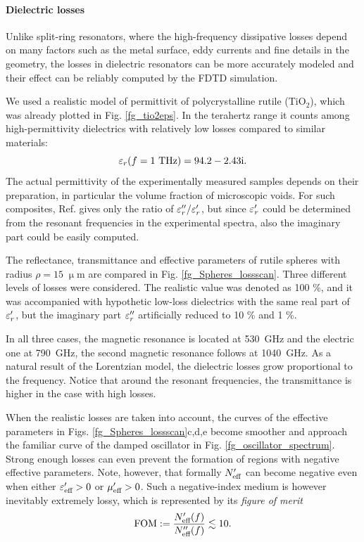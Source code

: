 \paragraph{Dielectric losses}%
Unlike split-ring resonators, where the high-frequency dissipative losses depend on many factors such as the metal surface, eddy currents and fine details in the geometry, the losses in dielectric resonators can be more accurately modeled and their effect can be reliably computed by the FDTD simulation. 

We used a realistic model \cite{baumard1977_epsilon_TiO2} of permittivit of polycrystalline rutile (TiO$_{2}$), which was already plotted in Fig. \ref{fg_tio2eps}. In the terahertz range it counts among high-permittivity dielectrics with relatively low losses compared to similar materials:
\begin{equation}\varepsilon_r(f=1\text{ THz}) = 94.2-2.43\text{i}. \label{eq_tio2}\end{equation}
The actual permittivity of the experimentally measured samples depends on their preparation, in particular the volume fraction of microscopic voids. For such composites, Ref. \cite{baumard1977_epsilon_TiO2} gives only the ratio of $\varepsilon_r''/\varepsilon_r'$, but since $\varepsilon_r'$ could be determined from the resonant frequencies in the experimental spectra, also the imaginary part could be easily computed.

The reflectance, transmittance and effective parameters of rutile spheres with radius $\rho=15\;\upmu$m are compared in Fig. \ref{fg_Spheres_lossscan}. Three different levels of losses were considered. The realistic value was denoted as 100 \%, and it was accompanied with hypothetic low-loss dielectrics with the same real part of $\varepsilon_r'$, but the imaginary part $\varepsilon_r''$ artificially reduced to  10 \% and 1 \%. 

In all three cases, the magnetic resonance is located at 530~GHz and the electric one at 790~GHz, the second magnetic resonance follows at 1040~GHz. As a natural result of the Lorentzian model, the dielectric losses grow proportional to the frequency. Notice that around the resonant frequencies, the transmittance is higher in the case with high losses.

When the realistic losses are taken into account, the curves of the effective parameters in Figs. \ref{fg_Spheres_lossscan}c,d,e become smoother and approach the familiar curve of the damped oscillator in Fig. \ref{fg_oscillator_spectrum}. Strong enough losses can even prevent the formation of regions with negative effective parameters. Note, however, that formally $N_{\text{eff} }'$ can become negative \cite[pp. 12--15]{pazoutova2011dp} even when either $\varepsilon_{\text{eff} }'>0$ or $\mu_{\text{eff} }'>0$. Such a negative-index medium is however inevitably extremely lossy, which is represented by its \textit{figure of merit}
\begin{equation} \text{FOM} := \frac{N_{\text{eff} }'(f)}{N_{\text{eff} }''(f)} \lesssim 10. \label{eq_fom}\end{equation}

